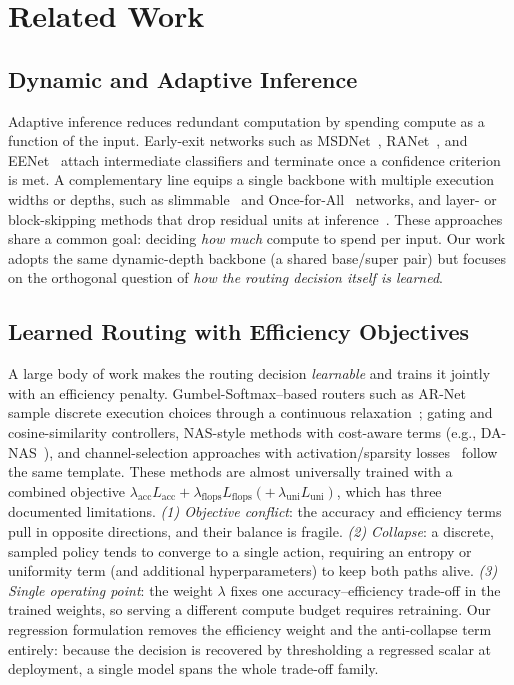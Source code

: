 \section{Related Work}
\label{sec:related}

\subsection{Dynamic and Adaptive Inference}
\label{sec:related_dynamic}
Adaptive inference reduces redundant computation by spending compute as a function
of the input. Early-exit networks such as
MSDNet~\cite{huang2018msdnet}, RANet~\cite{yang2020ranet}, and
EENet~\cite{ilhan2024eenet} attach intermediate classifiers and terminate once a
confidence criterion is met. A complementary line equips a single backbone with
multiple execution widths or depths, such as slimmable~\cite{yu2019slimmable} and
Once-for-All~\cite{cai2020ofa} networks, and layer- or block-skipping methods that
drop residual units at inference~\cite{wang2018skipnet,wu2018blockdrop}. These
approaches share a common goal: deciding \emph{how much} compute to spend per
input. Our work adopts the same dynamic-depth backbone (a shared base/super pair)
but focuses on the orthogonal question of \emph{how the routing decision itself is
learned}.


\subsection{Learned Routing with Efficiency Objectives}
\label{sec:related_routing}
A large body of work makes the routing decision \emph{learnable} and trains it
jointly with an efficiency penalty. Gumbel-Softmax--based
routers such as AR-Net~\cite{meng2020ar} sample discrete execution choices
through a continuous relaxation~\cite{jang2017gumbel}; gating and
cosine-similarity controllers, NAS-style methods with cost-aware terms (e.g.,
DA-NAS~\cite{dai2020danas}), and channel-selection approaches with
activation/sparsity losses~\cite{herrmann2020channel} follow the same template.
These methods are almost universally trained with a combined objective
$\lambda_{\mathrm{acc}}L_{\mathrm{acc}} + \lambda_{\mathrm{flops}}L_{\mathrm{flops}}
(+\,\lambda_{\mathrm{uni}}L_{\mathrm{uni}})$, which has three documented
limitations.
\emph{(1) Objective conflict}: the accuracy and efficiency terms pull in opposite
directions, and their balance is fragile.
\emph{(2) Collapse}: a discrete, sampled policy tends to converge to a single
action, requiring an entropy or uniformity term (and additional hyperparameters)
to keep both paths alive.
\emph{(3) Single operating point}: the weight $\lambda$ fixes one
accuracy--efficiency trade-off in the trained weights, so serving a different
compute budget requires retraining.
Our regression formulation removes the efficiency weight and the anti-collapse
term entirely: because the decision is recovered by thresholding a regressed
scalar at deployment, a single model spans the whole trade-off family. 



